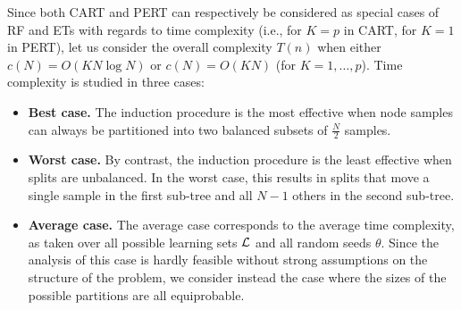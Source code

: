 Since both CART and PERT can respectively be considered as special cases of RF
and ETs with regards to time complexity (i.e., for $K=p$ in CART, for $K=1$ in
PERT), let us consider the overall complexity $T(n)$ when either
$c(N)=O(KN\log N)$ or $c(N)=O(KN)$ (for $K=1,\dots,p$). Time complexity
is studied in three cases:

\begin{itemize}
\item \textbf{Best case.} The induction procedure is the most effective
      when node samples can always be partitioned into two balanced subsets of $\tfrac{N}{2}$
      samples.

\item \textbf{Worst case.} By contrast, the induction procedure is the least
      effective when splits are unbalanced. In the worst case,
      this results in splits that move a single sample in the first sub-tree and
      all $N-1$ others in the second sub-tree.

\item \textbf{Average case.} The average case corresponds to the average time
      complexity, as taken over all possible learning sets ${\cal L}$ and
      all random seeds $\theta$.  Since the analysis of this case is hardly
      feasible without strong assumptions on the structure of the problem,
      we consider instead the case where the sizes of the possible
      partitions are all equiprobable.

\end{itemize}









